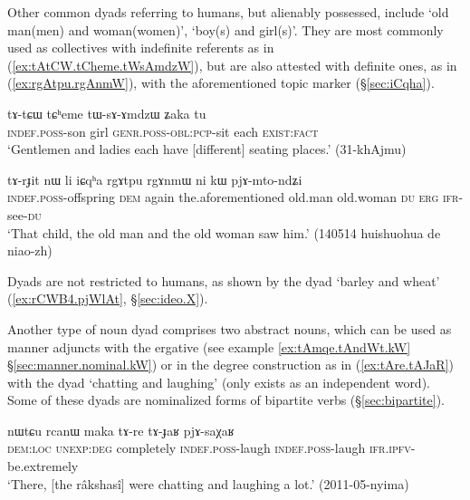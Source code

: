 Other common dyads referring to humans, but alienably possessed, include  `old man(men) and woman(women)',  `boy(s) and girl(s)'. They are most commonly used as collectives with indefinite referents as in (\ref{ex:tAtCW.tCheme.tWsAmdzW}), but are also attested with definite ones, as in (\ref{ex:rgAtpu.rgAnmW}), with the aforementioned topic marker  (§\ref{sec:iCqha}).
 
\begin{exe}
\ex \label{ex:tAtCW.tCheme.tWsAmdzW}
 \gll  tɤ-tɕɯ tɕʰeme tɯ-sɤ-ɤmdzɯ ʑaka tu \\
 \textsc{indef}.\textsc{poss}-son girl \textsc{genr}.\textsc{poss}-\textsc{obl}:\textsc{pcp}-sit each \textsc{exist}:\textsc{fact} \\
\glt `Gentlemen and ladies each have [different] seating places.' (31-khAjmu)
\end{exe}

\begin{exe}
\ex \label{ex:rgAtpu.rgAnmW}
 \gll tɤ-rɟit nɯ li iɕqʰa rgɤtpu rgɤnmɯ ni kɯ pjɤ-mto-ndʑi \\
 \textsc{indef}.\textsc{poss}-offspring \textsc{dem} again the.aforementioned  old.man old.woman \textsc{du} \textsc{erg} \textsc{ifr}-see-\textsc{du} \\
\glt `That child, the old man and the old woman saw him.' (140514 huishuohua de niao-zh)
\end{exe}

Dyads are not restricted to humans, as shown by the dyad  `barley and wheat' (\ref{ex:rCWB4.pjWlAt}, §\ref{sec:ideo.X}).


Another type of noun dyad comprises two abstract nouns, which can be used as manner adjuncts with the ergative (see example \ref{ex:tAmqe.tAndWt.kW} §\ref{sec:manner.nominal.kW}) or in the degree construction as in (\ref{ex:tAre.tAJaR}) with the dyad  `chatting and laughing' (only  exists as an independent word). Some of these dyads are nominalized forms of bipartite verbs (§\ref{sec:bipartite}).

\begin{exe}
\ex \label{ex:tAre.tAJaR}
 \gll  nɯtɕu rcanɯ maka tɤ-re tɤ-ɟaʁ pjɤ-saχaʁ \\
 \textsc{dem}:\textsc{loc} \textsc{unexp}:\textsc{deg} completely \textsc{indef}.\textsc{poss}-laugh \textsc{indef}.\textsc{poss}-laugh  \textsc{ifr}.\textsc{ipfv}-be.extremely \\
 \glt `There, [the râkshasî] were chatting and laughing a lot.' (2011-05-nyima)
\end{exe}

